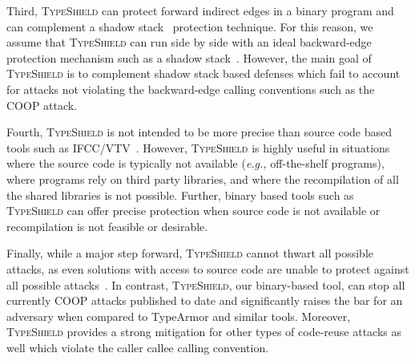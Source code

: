 Third, \textsc{TypeShield} can protect forward indirect edges 
in a binary program and can complement a shadow stack~\cite{dang:asiaccs} protection technique. For this reason, we assume that \textsc{TypeShield} can run side by side with an 
ideal backward-edge protection mechanism such as a shadow stack~\cite{conti:ccs}. However, the main goal of \textsc{TypeShield} is to complement 
shadow stack based defenses which fail to account for attacks not violating the backward-edge calling conventions such as the COOP attack.

Fourth, \textsc{TypeShield} is not intended to be more precise than source code based tools such as IFCC/VTV~\cite{vtv:tice}. However, 
\textsc{TypeShield} is highly useful in situations where the source code is typically not available (\textit{e.g.,} off-the-shelf programs), 
where programs rely on third party libraries, and where the recompilation of all the shared libraries is not possible. 
Further, binary based tools such as \textsc{TypeShield} can offer precise protection when source code is not available or 
recompilation is not feasible or desirable.

Finally, while a major step forward, \textsc{TypeShield} cannot thwart all possible attacks, as even solutions with access to source 
code are unable to protect against all possible attacks~\cite{carlini:bending}. In contrast, \textsc{TypeShield}, our binary-based tool, 
can stop all currently COOP attacks published to date and significantly raises the bar for an adversary when compared to
TypeArmor and similar tools. Moreover, \textsc{TypeShield} provides a strong mitigation for other types of code-reuse attacks as well
which violate the caller callee calling convention.
